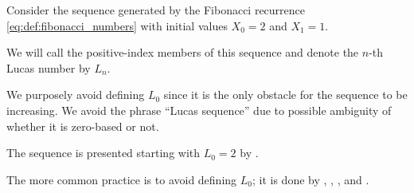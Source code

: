 \begin{definition}\label{def:lucas_numbers}
  Consider the sequence generated by the Fibonacci recurrence \eqref{eq:def:fibonacci_numbers} with initial values \( X_0 = 2 \) and \( X_1 = 1 \).

  We will call the positive-index members of this sequence  and denote the \( n \)-th Lucas number by \( L_n \).
\end{definition}
\begin{comments}
  \item We purposely avoid defining \( L_0 \) since it is the only obstacle for the sequence to be increasing. We avoid the phrase \enquote{Lucas sequence} due to possible ambiguity of whether it is zero-based or not.

  \item The sequence is presented starting with \( L_0 = 2 \) by \textcite[112]{ConwayGuy1998BookOfNumbers}.

  The more common practice is to avoid defining \( L_0 \); it is done by \textcite[exerc. III.2.9]{Aigner1997CombinatorialTheory}, \textcite[example 1.1.6]{Stanley2012EnumerativeCombinatoricsVol1}, \textcite[example 15]{Rosen2019DiscreteMathematics}, \textcite[273]{Deza2012FigurateNumbers} and \textcite[240]{Strang2023LinearAlgebra}.
\end{comments}

